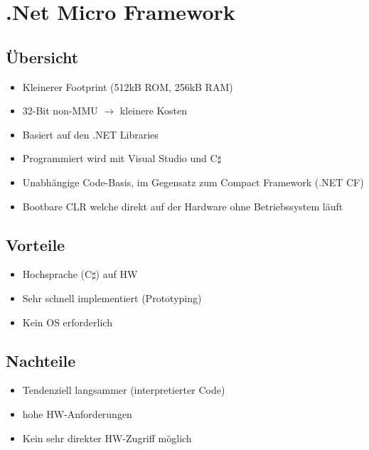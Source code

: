 \section{.Net Micro Framework}
\label{netmicro}
\subsection{Übersicht}
\begin{itemize}
	\item Kleinerer Footprint (512kB ROM, 256kB RAM)
	\item 32-Bit non-MMU $\rightarrow$ kleinere Kosten
	\item Basiert auf den .NET Libraries
	\item Programmiert wird mit Visual Studio und C$\sharp$
	\item Unabhängige Code-Basis, im Gegensatz zum Compact Framework (.NET CF)
	\item Bootbare CLR welche direkt auf der Hardware ohne Betriebssystem läuft
\end{itemize}

\subsection{Vorteile}
\begin{itemize}
	\item Hochsprache (C$\sharp$) auf HW
	\item Sehr schnell implementiert (Prototyping)
	\item Kein OS erforderlich
\end{itemize}

\subsection{Nachteile}
\begin{itemize}
	\item Tendenziell langsammer (interpretierter Code)
	\item hohe HW-Anforderungen
	\item Kein sehr direkter HW-Zugriff möglich
\end{itemize}
